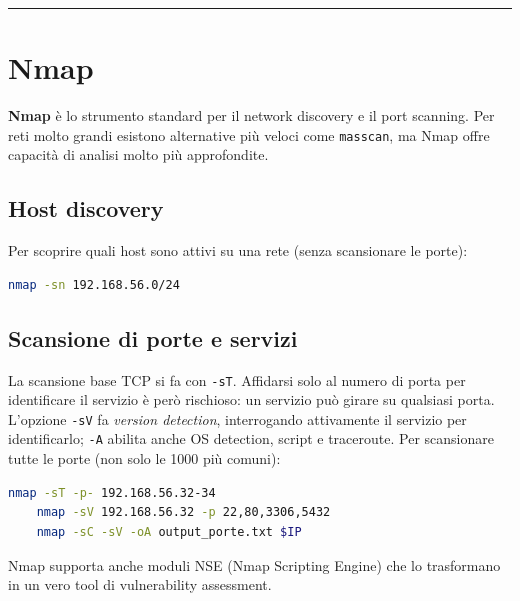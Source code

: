 \documentclass[12pt, a4paper]{report}
\begin{document}
\noindent\rule{\textwidth}{0.4pt}

\section{Nmap}
\textbf{Nmap} è lo strumento standard per il network discovery e il port scanning. Per reti molto grandi esistono alternative più veloci come \texttt{masscan}, ma Nmap offre capacità di analisi molto più approfondite.

\subsection{Host discovery}
Per scoprire quali host sono attivi su una rete (senza scansionare le porte):

\begin{lstlisting}[language=bash]
	nmap -sn 192.168.56.0/24
\end{lstlisting}

\subsection{Scansione di porte e servizi}
La scansione base TCP si fa con \texttt{-sT}. Affidarsi solo al numero di porta per identificare il servizio è però rischioso: un servizio può girare su qualsiasi porta. L'opzione \texttt{-sV} fa \textit{version detection}, interrogando attivamente il servizio per identificarlo; \texttt{-A} abilita anche OS detection, script e traceroute. Per scansionare tutte le porte (non solo le 1000 più comuni):

\begin{lstlisting}[language=bash]
	nmap -sT -p- 192.168.56.32-34
	nmap -sV 192.168.56.32 -p 22,80,3306,5432
	nmap -sC -sV -oA output_porte.txt $IP
\end{lstlisting}

Nmap supporta anche moduli NSE (Nmap Scripting Engine) che lo trasformano in un vero tool di vulnerability assessment.
\end{document}
